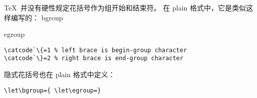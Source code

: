 \documentclass{book}
\begin{document}
\TeX\ 并没有硬性规定花括号作为组开始和结束符。
在 plain 格式中，它是类似这样编写的：
\cstoidx bgroup\par\cstoidx egroup\par
\begin{verbatim}
\catcode`\{=1 % left brace is begin-group character
\catcode`\}=2 % right brace is end-group character
\end{verbatim}
隐式花括号也在 plain 格式中定义：
\begin{verbatim}
\let\bgroup={ \let\egroup=}
\end{verbatim}
\end{document}
